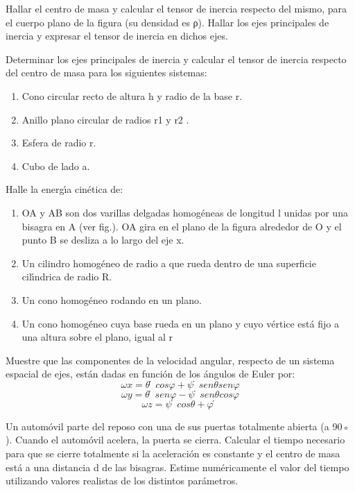 \documentclass[10pt,oneside]{CBFT_book}
\begin{document}
\begin{ejercicios}

\label{ej1}
\item{ \bf }
Hallar el centro de masa y calcular el tensor de inercia respecto del mismo, para el
cuerpo plano de la figura (su densidad es ρ). Hallar los ejes principales de inercia y
expresar el tensor de inercia en dichos ejes.

\label{ej2}
\item{ \bf }
Determinar los ejes principales de inercia y calcular el tensor de inercia respecto del
centro de masa para los siguientes sistemas:
\begin{enumerate}[label=(\alph*)]
\item Cono circular recto de altura h y radio de la base r.
\item Anillo plano circular de radios r1 y r2 .
\item Esfera de radio r.
\item Cubo de lado a.
\end{enumerate}

\label{ej3}
\item{ \bf }
Halle la energı́a cinética de:
\begin{enumerate}[label=(\alph*)]
\item OA y AB son dos varillas delgadas homogéneas de longitud l unidas por una
bisagra en A (ver fig.). OA gira en el plano de la figura alrededor de O y el
punto B se desliza a lo largo del eje x.
\item Un cilindro homogéneo de radio a que rueda dentro de una superficie cilı́ndrica
de radio R.
\item Un cono homogéneo rodando en un plano.
\item Un cono homogéneo cuya base rueda en un plano y cuyo vértice está fijo a una
altura sobre el plano, igual al r
\end{enumerate}

\label{ej4}
\item{ \bf }
Muestre que las componentes de la velocidad angular, respecto de un sistema espacial
de ejes, están dadas en función de los ángulos de Euler por:
\[
	ωx = θ̇ cos φ + ψ̇senθsenφ
\]
\[
	ωy = θ̇senφ − ψ̇senθ cos φ
\]
\[
	ωz = ψ̇ cos θ + φ̇
\]

\label{ej5}
\item{ \bf }
Un automóvil parte del reposo con una de sus puertas totalmente abierta (a 90◦ ).
Cuando el automóvil acelera, la puerta se cierra. Calcular el tiempo necesario para
que se cierre totalmente si la aceleración es constante y el centro de masa está a una
distancia d de las bisagras. Estime numéricamente el valor del tiempo utilizando valores
realistas de los distintos parámetros.


\end{ejercicios}
\end{document}
